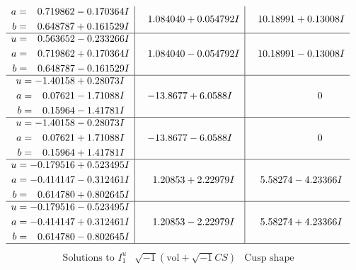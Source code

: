 \documentclass[1p]{elsarticle_modified}
\theoremstyle{definition}
\newcommand{\I}{\sqrt{-1}}
\begin{document}
$$\begin{array}{c|c|c}
\begin{aligned}
a &= \phantom{-}0.719862 - 0.170364 I \\
b &= \phantom{-}0.648787 + 0.161529 I\end{aligned}
 & \phantom{-}1.084040 + 0.054792 I & \phantom{-}10.18991 + 0.13008 I \\ \hline\begin{aligned}
u &= \phantom{-}0.563652 - 0.233266 I \\
a &= \phantom{-}0.719862 + 0.170364 I \\
b &= \phantom{-}0.648787 - 0.161529 I\end{aligned}
 & \phantom{-}1.084040 - 0.054792 I & \phantom{-}10.18991 - 0.13008 I \\ \hline\begin{aligned}
u &= -1.40158 + 0.28073 I \\
a &= \phantom{-}0.07621 - 1.71088 I \\
b &= \phantom{-}0.15964 - 1.41781 I\end{aligned}
 & -13.8677 + 6.0588 I & \phantom{-0.000000 } 0 \\ \hline\begin{aligned}
u &= -1.40158 - 0.28073 I \\
a &= \phantom{-}0.07621 + 1.71088 I \\
b &= \phantom{-}0.15964 + 1.41781 I\end{aligned}
 & -13.8677 - 6.0588 I & \phantom{-0.000000 } 0 \\ \hline\begin{aligned}
u &= -0.179516 + 0.523495 I \\
a &= -0.414147 - 0.312461 I \\
b &= \phantom{-}0.614780 + 0.802645 I\end{aligned}
 & \phantom{-}1.20853 + 2.22979 I & \phantom{-}5.58274 - 4.23366 I \\ \hline\begin{aligned}
u &= -0.179516 - 0.523495 I \\
a &= -0.414147 + 0.312461 I \\
b &= \phantom{-}0.614780 - 0.802645 I\end{aligned}
 & \phantom{-}1.20853 - 2.22979 I & \phantom{-}5.58274 + 4.23366 I\\
 \hline 
 \end{array}$$\newpage$$\begin{array}{c|c|c}  
\text{Solutions to }I^u_{1}& \I (\text{vol} + \sqrt{-1}CS) & \text{Cusp shape}\\
 \hline 
\begin{aligned}

\end{aligned}
\end{array}$$
\end{document}
